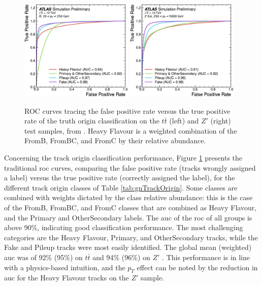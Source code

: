 \begin{figure}[h!]
  \centering
  \includegraphics[width=0.48\textwidth]{Images/FTAG/GN/GN1/ablations/ttroc.png}
  \includegraphics[width=0.48\textwidth]{Images/FTAG/GN/GN1/ablations/zproc.png}
  \caption{ROC curves tracing the false positive rate versus the true positive rate of the truth origin classification on the $t\bar{t}$ (left) and $Z'$ (right) test samples, from \cite{ATL-PHYS-PUB-2022-027}. Heavy Flavour is a weighted combination of the FromB, FromBC, and FromC by their relative abundance.}
  \label{fig:GN1trackperf}
\end{figure} 

Concerning the track origin classification performance, Figure \ref{fig:GN1trackperf} presents the traditional \gls{roc} curves, comparing the false positive rate (tracks wrongly assigned a label) versus the true positive rate (correctly assigned the label), for the different track origin classes of Table \ref{tab:gnTrackOrigin}. Some classes are combined with weights dictated by the class relative abundance: this is the case of the FromB, FromBC, and FromC classes that are combined as Heavy Flavour, and the Primary and OtherSecondary labels. The \gls{auc} of the \gls{roc} of all groups is above 90\%, indicating good classification performance. The most challenging categories are the Heavy Flavour, Primary, and OtherSecondary tracks, while the Fake and Pileup tracks were most easily identified. The global mean (weighted) \gls{auc} was of 92\% (95\%) on $t\bar{t}$ and 94\% (96\%) on $Z'$ \cite{ATL-PHYS-PUB-2022-027}. This performance is in line with a physics-based intuition, and the $p_T$ effect can be noted by the reduction in \gls{auc} for the Heavy Flavour tracks on the $Z'$ sample. \\

